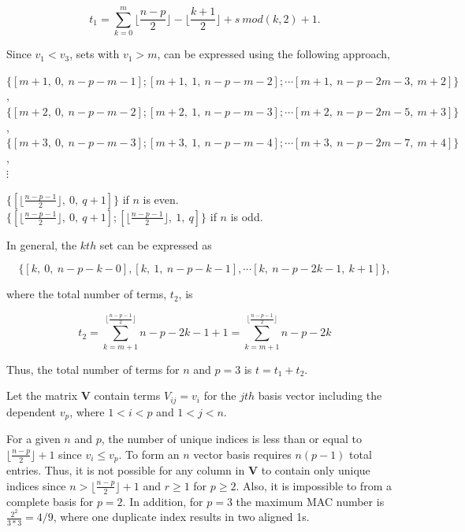 \documentclass[3p,times]{elsarticle}
\begin{document}
\begin{equation}
t_1=\sum_{k=0}^{m} \lfloor\frac{n-p}{2}\rfloor-\lfloor\frac{k+1}{2}\rfloor+s\ mod(k,2)+1.
\end{equation}

Since $v_1<v_3$, sets with $v_1>m$, can be expressed using the following approach,

\begin{center}
$\{[m+1,\ 0,\ n-p-m-1]; [m+1,\ 1,\ n-p-m-2]; \cdots [m+1,\ n-p-2m-3,\ m+2]\}$,\\
$\{[m+2,\ 0,\ n-p-m-2]; [m+2,\ 1,\ n-p-m-3]; \cdots [m+2,\ n-p-2m-5,\ m+3]\}$,\\
$\{[m+3,\ 0,\ n-p-m-3]; [m+3,\ 1,\ n-p-m-4]; \cdots [m+3,\ n-p-2m-7,\ m+4]\}$,\\
$\vdots$ \\
\end{center}

\begin{center}
$\{[\lfloor\frac{n-p-1}{2}\rfloor,\ 0,\ q+1]\}$ if $n$ is even.\\
$\{[\lfloor\frac{n-p-1}{2}\rfloor,\ 0,\ q+1]; [\lfloor\frac{n-p-1}{2}\rfloor,\ 1,\ q]\}$ if $n$ is odd.
\end{center} 

In general, the $kth$ set can be expressed as 

\begin{equation}
\{[k,\ 0,\ n-p-k-0], [k,\ 1,\ n-p-k-1], \cdots [k,\ n-p-2k-1,\ k+1]\},
\end{equation}

where the total number of terms, $t_2$, is

\begin{equation}
t_2=\sum_{k=m+1}^{\lfloor\frac{n-p-1}{2}\rfloor} n-p-2k-1+1 =\sum_{k=m+1}^{\lfloor\frac{n-p-1}{2}\rfloor} n-p-2k
\end{equation}

Thus, the total number of terms for $n$ and $p=3$ is $t=t_1+t_2$.  

Let the matrix $\textbf{V}$ contain terms $V_{ij}=v_i$ for the $jth$ basis vector including the dependent $v_p$, where $1<i<p$ and $1<j<n$.

For a given $n$ and $p$, the number of unique indices is less than or equal to $\lfloor \frac{n-p}{2}\rfloor+1$ since $v_i\le v_p$.  
To form an $n$ vector basis requires $n\left(p-1\right)$ total entries.  
Thus, it is not possible for any column in $\textbf{V}$ to contain only unique indices since $n>\lfloor \frac{n-p}{2}\rfloor+1$ and $r\ge 1$ for $p\ge2$.  
Also, it is impossible to from a complete basis for $p=2$.  
In addition, for $p=3$ the maximum MAC number is $\frac{2^2}{3*3}=4/9$, where one duplicate index results in two aligned 1s.
\end{document}

